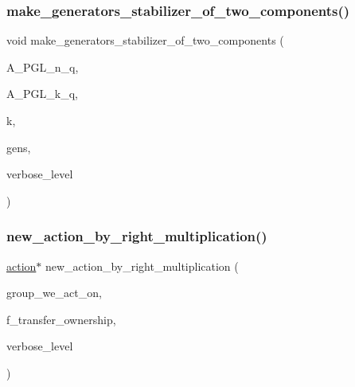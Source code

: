 \mbox{\label{action__global_8_c_af4fb463f6162ded3a77b674093f1e0bd}} 
\subsubsection{\texorpdfstring{make\+\_\+generators\+\_\+stabilizer\+\_\+of\+\_\+two\+\_\+components()}{make\_generators\_stabilizer\_of\_two\_components()}}
{\footnotesize\ttfamily void make\+\_\+generators\+\_\+stabilizer\+\_\+of\+\_\+two\+\_\+components (\begin{DoxyParamCaption}\item[{\mbox{\hyperlink{classaction}{action}} $\ast$}]{A\+\_\+\+P\+G\+L\+\_\+n\+\_\+q,  }\item[{\mbox{\hyperlink{classaction}{action}} $\ast$}]{A\+\_\+\+P\+G\+L\+\_\+k\+\_\+q,  }\item[{\mbox{\hyperlink{galois_8h_a09fddde158a3a20bd2dcadb609de11dc}{I\+NT}}}]{k,  }\item[{\mbox{\hyperlink{classvector__ge}{vector\+\_\+ge}} $\ast$}]{gens,  }\item[{\mbox{\hyperlink{galois_8h_a09fddde158a3a20bd2dcadb609de11dc}{I\+NT}}}]{verbose\+\_\+level }\end{DoxyParamCaption})}

\mbox{\label{action__global_8_c_a46c2d6dc9b957db2383ed77bd20086ab}} 
\subsubsection{\texorpdfstring{new\+\_\+action\+\_\+by\+\_\+right\+\_\+multiplication()}{new\_action\_by\_right\_multiplication()}}
{\footnotesize\ttfamily \mbox{\hyperlink{classaction}{action}}$\ast$ new\+\_\+action\+\_\+by\+\_\+right\+\_\+multiplication (\begin{DoxyParamCaption}\item[{\mbox{\hyperlink{classsims}{sims}} $\ast$}]{group\+\_\+we\+\_\+act\+\_\+on,  }\item[{\mbox{\hyperlink{galois_8h_a09fddde158a3a20bd2dcadb609de11dc}{I\+NT}}}]{f\+\_\+transfer\+\_\+ownership,  }\item[{\mbox{\hyperlink{galois_8h_a09fddde158a3a20bd2dcadb609de11dc}{I\+NT}}}]{verbose\+\_\+level }\end{DoxyParamCaption})}

